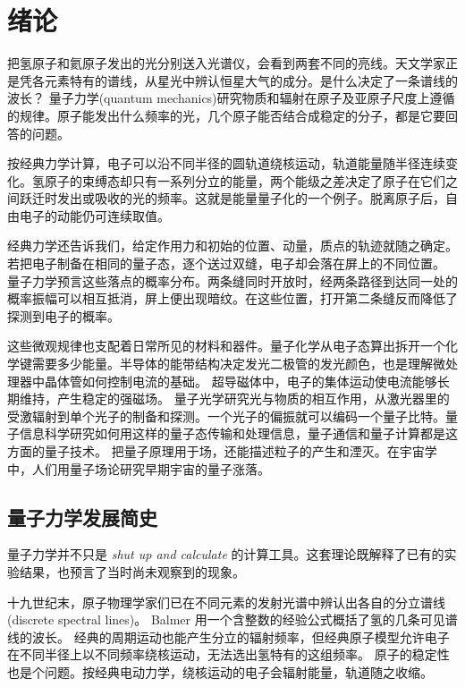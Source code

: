 \setcounter{chapter}{-1}

\chapter{绪论}
\label{ch:intro}

把氢原子和氦原子发出的光分别送入光谱仪，会看到两套不同的亮线。天文学家正是凭各元素特有的谱线，从星光中辨认恒星大气的成分。是什么决定了一条谱线的波长？
量子力学(quantum mechanics)研究物质和辐射在原子及亚原子尺度上遵循的规律。原子能发出什么频率的光，几个原子能否结合成稳定的分子，都是它要回答的问题。

按经典力学计算，电子可以沿不同半径的圆轨道绕核运动，轨道能量随半径连续变化。氢原子的束缚态却只有一系列分立的能量，两个能级之差决定了原子在它们之间跃迁时发出或吸收的光的频率。这就是能量量子化的一个例子。脱离原子后，自由电子的动能仍可连续取值。

经典力学还告诉我们，给定作用力和初始的位置、动量，质点的轨迹就随之确定。若把电子制备在相同的量子态，逐个送过双缝，电子却会落在屏上的不同位置。
量子力学预言这些落点的概率分布。两条缝同时开放时，经两条路径到达同一处的概率振幅可以相互抵消，屏上便出现暗纹。在这些位置，打开第二条缝反而降低了探测到电子的概率。

这些微观规律也支配着日常所见的材料和器件。量子化学从电子态算出拆开一个化学键需要多少能量。半导体的能带结构决定发光二极管的发光颜色，也是理解微处理器中晶体管如何控制电流的基础。
超导磁体中，电子的集体运动使电流能够长期维持，产生稳定的强磁场。
量子光学研究光与物质的相互作用，从激光器里的受激辐射到单个光子的制备和探测。一个光子的偏振就可以编码一个量子比特。量子信息科学研究如何用这样的量子态传输和处理信息，量子通信和量子计算都是这方面的量子技术。
把量子原理用于场，还能描述粒子的产生和湮灭。在宇宙学中，人们用量子场论研究早期宇宙的量子涨落。

\section{量子力学发展简史}
\label{sec:timeline}
量子力学并不只是 \textit{shut up and calculate} 的计算工具。这套理论既解释了已有的实验结果，也预言了当时尚未观察到的现象。

十九世纪末，原子物理学家们已在不同元素的发射光谱中辨认出各自的分立谱线(discrete spectral lines)。
Balmer 用一个含整数的经验公式概括了氢的几条可见谱线的波长。
经典的周期运动也能产生分立的辐射频率，但经典原子模型允许电子在不同半径上以不同频率绕核运动，无法选出氢特有的这组频率。
原子的稳定性也是个问题。按经典电动力学，绕核运动的电子会辐射能量，轨道随之收缩。

